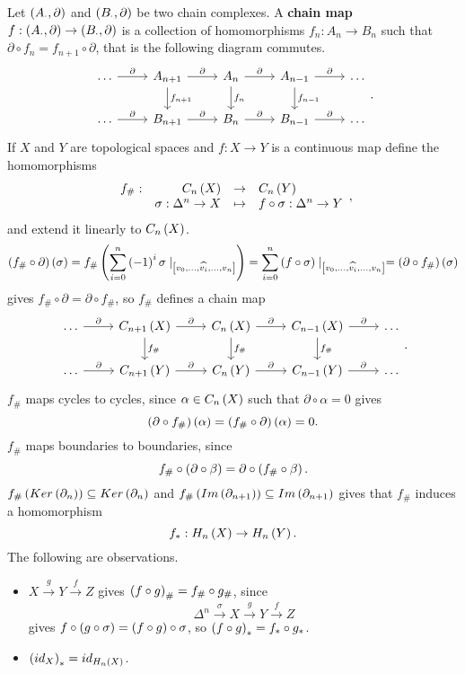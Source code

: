 Let $ \left( A_\cdot, \partial \right) $ and $ \left( B_\cdot, \partial \right) $ be two chain complexes. A \textbf{chain map} $ f : \left( A_\cdot, \partial \right) \to \left( B_\cdot, \partial \right) $ is a collection of homomorphisms $ f_n : A_n \to B_n $ such that $ \partial \circ f_n = f_{n + 1} \circ \partial $, that is the following diagram commutes.
$$
\begin{tikzcd}
\dots \arrow{r}{\partial} & A_{n + 1} \arrow{r}{\partial} \arrow{d}{f_{n + 1}} & A_n \arrow{r}{\partial} \arrow{d}{f_n} & A_{n - 1} \arrow{r}{\partial} \arrow{d}{f_{n - 1}} & \dots \\
\dots \arrow{r}{\partial} & B_{n + 1} \arrow{r}{\partial} & B_n \arrow{r}{\partial} & B_{n - 1} \arrow{r}{\partial} & \dots
\end{tikzcd}.
$$
If $ X $ and $ Y $ are topological spaces and $ f : X \to Y $ is a continuous map define the homomorphisms
$$ \function[f_\#]{C_n\rb{X}}{C_n\rb{Y}}{\sigma : \Delta^n \to X}{f \circ \sigma : \Delta^n \to Y}, $$
and extend it linearly to $ C_n\left( X \right) $.
$$ \left( f_\# \circ \partial \right)\left( \sigma \right) = f_\#\left( \sum_{i = 0}^n \left( -1 \right)^i\sigma \mid_{\left[ v_0, \dots, \widehat{v_i}, \dots, v_n \right]} \right) = \sum_{i = 0}^n \left( f \circ \sigma \right) \mid_{\left[ v_0, \dots, \widehat{v_i}, \dots, v_n \right]} = \left( \partial \circ f_\# \right)\left( \sigma \right) $$
gives $ f_\# \circ \partial = \partial \circ f_\# $, so $ f_\# $ defines a chain map
$$
\begin{tikzcd}
\dots \arrow{r}{\partial} & C_{n + 1}\rb{X} \arrow{r}{\partial} \arrow{d}{f_\#} & C_n\rb{X} \arrow{r}{\partial} \arrow{d}{f_\#} & C_{n - 1}\rb{X} \arrow{r}{\partial} \arrow{d}{f_\#} & \dots \\
\dots \arrow{r}{\partial} & C_{n + 1}\rb{Y} \arrow{r}{\partial} & C_n\rb{Y} \arrow{r}{\partial} & C_{n - 1}\rb{Y} \arrow{r}{\partial} & \dots
\end{tikzcd}.
$$
$ f_\# $ maps cycles to cycles, since $ \alpha \in C_n\left( X \right) $ such that $ \partial \circ \alpha = 0 $ gives
$$ \left( \partial \circ f_\# \right)\left( \alpha \right) = \left( f_\# \circ \partial \right)\left( \alpha \right) = 0. $$
$ f_\# $ maps boundaries to boundaries, since
$$ f_\# \circ \left( \partial \circ \beta \right) = \partial \circ \left( f_\# \circ \beta \right). $$
$ f_\#\left( Ker\left( \partial_n \right) \right) \subseteq Ker\left( \partial_n \right) $ and $ f_\#\left( Im\left( \partial_{n + 1} \right) \right) \subseteq Im\left( \partial_{n + 1} \right) $ gives that $ f_\# $ induces a homomorphism
$$ f_* : H_n\left( X \right) \to H_n\left( Y \right). $$
The following are observations.
\begin{itemize}
\item $ X \xrightarrow{g} Y \xrightarrow{f} Z $ gives $ \left( f \circ g \right)_\# = f_\# \circ g_\# $, since
$$ \Delta^n \xrightarrow{\sigma} X \xrightarrow{g} Y \xrightarrow{f} Z $$
gives $ f \circ \left( g \circ \sigma \right) = \left( f \circ g \right) \circ \sigma $, so $ \left( f \circ g \right)_* = f_* \circ g_* $.
\item $ \left( id_X \right)_* = id_{H_n\left( X \right)} $.
\end{itemize}

